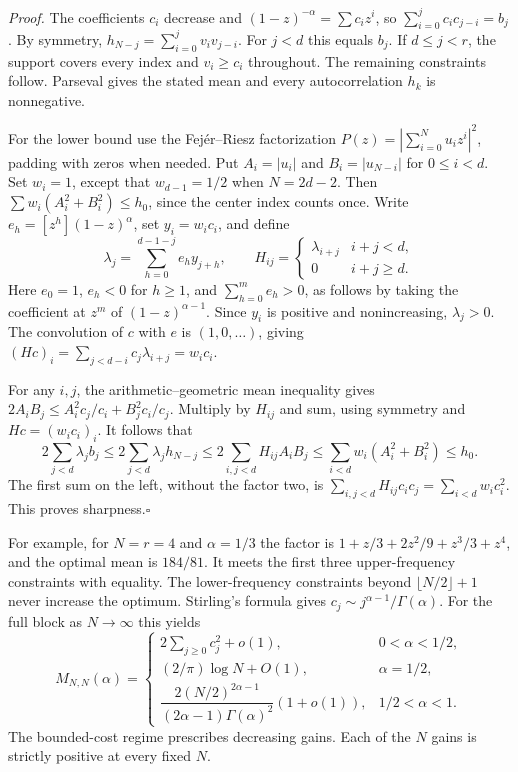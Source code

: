 \medskip\noindent\emph{Proof.}
The coefficients $c_i$ decrease and $(1-z)^{-\alpha}=\sum c_i z^i$,
so $\sum_{i=0}^j c_ic_{j-i}=b_j$. By symmetry,
$h_{N-j}=\sum_{i=0}^j v_i v_{j-i}$.
For $j<d$ this equals $b_j$. If $d\le j<r$, the support covers every index
and $v_i\ge c_i$ throughout. The remaining constraints follow. Parseval gives the stated
mean and every autocorrelation $h_k$ is nonnegative.

For the lower bound use the Fej\'er--Riesz factorization
$P(z)=|\sum_{i=0}^N u_i z^i|^2$, padding with zeros when needed.
Put $A_i=|u_i|$ and $B_i=|u_{N-i}|$ for $0\le i<d$.
Set $w_i=1$, except that $w_{d-1}=1/2$ when $N=2d-2$.
Then $\sum w_i(A_i^2+B_i^2)\le h_0$, since the center index counts once.
Write $e_h=[z^h](1-z)^\alpha$, set $y_i=w_ic_i$, and define
\[
 \lambda_j=\sum_{h=0}^{d-1-j}e_h y_{j+h},\qquad
 H_{ij}=\begin{cases}\lambda_{i+j}& i+j<d,\\0&i+j\ge d.\end{cases}
\]
Here $e_0=1$, $e_h<0$ for $h\ge1$, and $\sum_{h=0}^m e_h>0$,
as follows by taking the coefficient at $z^m$ of $(1-z)^{\alpha-1}$.
Since $y_i$ is positive and nonincreasing, $\lambda_j>0$. The convolution
of $c$ with $e$ is $(1,0,\ldots)$, giving
$(Hc)_i=\sum_{j<d-i}c_j\lambda_{i+j}=w_ic_i$.

For any $i,j$, the arithmetic--geometric mean inequality gives
$2 A_i B_j\le A_i^2 c_j/c_i+B_j^2 c_i/c_j$. Multiply by $H_{ij}$
and sum, using symmetry and $Hc=(w_i c_i)_i$. It follows that
\[
 2\sum_{j<d}\lambda_j b_j
 \le 2\sum_{j<d}\lambda_j h_{N-j}
 \le 2\sum_{i,j<d} H_{ij}A_i B_j
 \le \sum_{i<d}w_i(A_i^2+B_i^2)\le h_0.
\]
The first sum on the left, without the factor two, is
$\sum_{i,j<d}H_{ij}c_i c_j=\sum_{i<d}w_ic_i^2$.
This proves sharpness.\hfill$\square$

\medskip
For example, for $N=r=4$ and $\alpha=1/3$ the factor is
$1+z/3+2z^2/9+z^3/3+z^4$, and the optimal mean is $184/81$.
It meets the first three upper-frequency constraints with equality.
The lower-frequency constraints beyond $\lfloor N/2\rfloor+1$ never increase the optimum.
Stirling's formula gives $c_j\sim j^{\alpha-1}/\Gamma(\alpha)$. For the full
block as $N\to\infty$ this yields
\[
 M_{N,N}(\alpha)=
 \begin{cases}
 2\sum_{j\ge0}c_j^2+o(1), &0<\alpha<1/2,\\
 (2/\pi)\log N+O(1), &\alpha=1/2,\\
 \dfrac{2(N/2)^{2\alpha-1}}{(2\alpha-1)\Gamma(\alpha)^2}(1+o(1)),
 &1/2<\alpha<1 .
 \end{cases}
\]
The bounded-cost regime prescribes decreasing gains. Each of the $N$ gains
is strictly positive at every fixed $N$.

